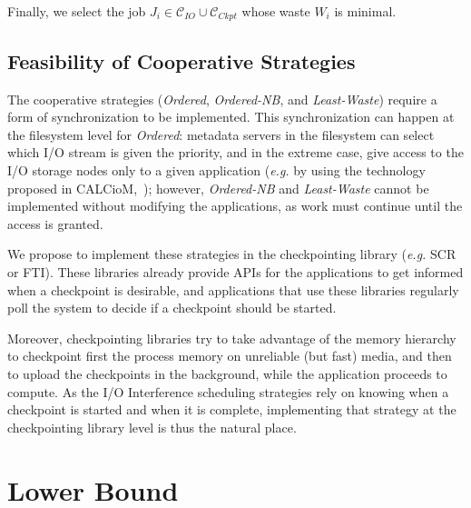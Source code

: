 \documentclass[conference,nofonttune]{IEEEtran}
\newcommand{\eg}[0]{\emph{e.g.}\xspace}
\newcommand{\wap}[1]{W_{#1}}
\newcommand{\Catiocat}{\mathcal{C}_{IO}\xspace}
\newcommand{\Catckptcat}{\mathcal{C}_{Ckpt}\xspace}
\newcommand{\fifoblock}{\emph{Ordered}\xspace}
\newcommand{\fifononblock}{\emph{Ordered-NB}\xspace}
\newcommand{\leastwaste}{\emph{Least-Waste}\xspace}
\begin{document}
Finally, we select the job $J_{i} \in \Catiocat \cup \Catckptcat$
whose waste $\wap{i}$ is minimal. 

\subsection{Feasibility of Cooperative Strategies}
\label{sec:feasibility}

The cooperative strategies (\fifoblock, \fifononblock, and
\leastwaste) require a form of synchronization to be implemented. This
synchronization can happen at the filesystem level for \fifoblock:
metadata servers in the filesystem can select which I/O stream is
given the priority, and in the extreme case, give access to the I/O
storage nodes only to a given application (\eg by using the technology
proposed in CALCioM,~\cite{Dorier2015}); however, \fifononblock and
\leastwaste cannot be implemented without modifying the applications,
as work must continue until the access is granted.

We propose to implement these strategies in the checkpointing library
(\eg SCR or FTI). These libraries already provide APIs for the
applications to get informed when a checkpoint is desirable, and
applications that use these libraries regularly poll the system to
decide if a checkpoint should be started.

Moreover, checkpointing libraries try to take advantage of the memory
hierarchy to checkpoint first the process memory on unreliable (but
fast) media, and then to upload the checkpoints in the background,
while the application proceeds to compute. As the I/O Interference
scheduling strategies rely on knowing when a checkpoint is started and
when it is complete, implementing that strategy at the checkpointing
library level is thus the natural place.

%

\section{Lower Bound}
\label{sec:lowerbound}
\end{document}

